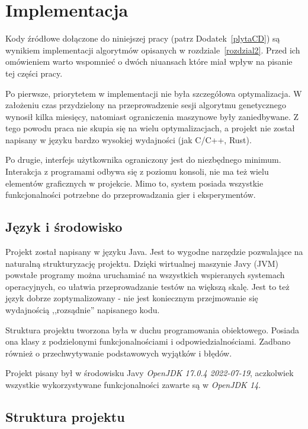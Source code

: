 \chapter{Implementacja}
\thispagestyle{chapterBeginStyle}
\label{rozdzial3}


Kody źródłowe dołączone do niniejszej pracy (patrz Dodatek~\ref{plytaCD}) są wynikiem implementacji algorytmów opisanych w rozdziale~\ref{rozdzial2}. Przed ich omówieniem warto wspomnieć o dwóch niuansach które miał wpływ na pisanie tej części pracy.

Po pierwsze, priorytetem w implementacji nie była szczegółowa optymalizacja. W założeniu czas przydzielony na przeprowadzenie sesji algorytmu genetycznego wynosił kilka miesięcy, natomiast ograniczenia maszynowe były zaniedbywane. Z tego powodu praca nie skupia się na wielu optymalizacjach, a projekt nie został napisany w języku bardzo wysokiej wydajności (jak C/C++, Rust). 

Po drugie, interfejs użytkownika ograniczony jest do niezbędnego minimum. Interakcja z programami odbywa się z poziomu konsoli, nie ma też wielu elementów graficznych w projekcie. Mimo to, system posiada wszystkie funkcjonalności potrzebne do przeprowadzania gier i eksperymentów.

\section{Język i środowisko}

Projekt został napisany w języku Java. Jest to wygodne narzędzie pozwalające na naturalną strukturyzację projektu. Dzięki wirtualnej maszynie Javy (JVM) powstałe programy można uruchamiać na wszystkich wspieranych systemach operacyjnych, co ułatwia przeprowadzanie testów na większą skalę. Jest to też język dobrze zoptymalizowany - nie jest koniecznym przejmowanie się wydajnością ,,rozsądnie'' napisanego kodu.

Struktura projektu tworzona była w duchu programowania obiektowego. Posiada ona klasy z podzielonymi funkcjonalnościami i odpowiedzialnościami. Zadbano również o przechwytywanie podstawowych wyjątków i błędów.

Projekt pisany był w środowisku Javy \textit{OpenJDK 17.0.4 2022-07-19}, aczkolwiek wszystkie wykorzystywane funkcjonalności zawarte są w \textit{OpenJDK 14}.

\section{Struktura projektu}
\label{porozdzial3-2}

